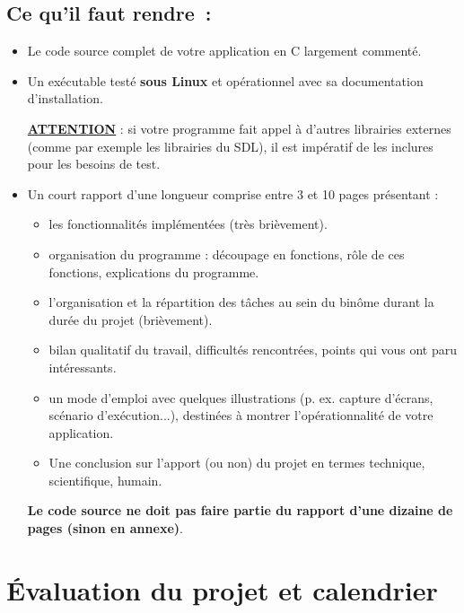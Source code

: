 \documentclass[10pt]{article}
\begin{document}
\subsection*{Ce qu'il faut rendre~:}
\begin{itemize}
\item Le code source complet de votre application en C largement comment\'e.

\item Un ex\'ecutable test\'e \textbf{sous Linux} et op\'erationnel avec sa documentation d'installation. 

\underline{\bf ATTENTION} : 
si votre programme fait appel \`a d'autres librairies externes (comme par exemple 
les librairies du SDL), il est imp\'eratif de les inclures pour les besoins de test. 

\item Un court rapport d'une longueur comprise entre 3 et 10 pages pr\'esentant :
  \begin{itemize}
    \item les fonctionnalit\'es impl\'ement\'ees (tr\`es bri\`evement).
    \item organisation du programme : d\'ecoupage en fonctions, r\^ole de 
      ces fonctions, explications du programme. 
    \item l'organisation et la r\'epartition des t\^aches au sein du bin\^ome 
      durant la dur\'ee du projet (bri\`evement).
    \item bilan qualitatif du travail, difficult\'es rencontr\'ees, points qui 
      vous ont paru int\'eressants. 
    \item un mode d'emploi avec quelques illustrations (p. ex. capture d'\'ecrans, 
      sc\'enario d'ex\'ecution...), destin\'ees \`a montrer l'op\'erationnalit\'e 
      de votre application.
    \item Une conclusion sur l'apport (ou non) du projet en termes technique,
      scientifique, humain. 
  \end{itemize}

\textbf{Le code source ne doit pas faire partie du rapport d'une dizaine de pages 
(sinon en annexe)}.
\end{itemize}

\section{\'Evaluation du projet et calendrier}
\end{document}
